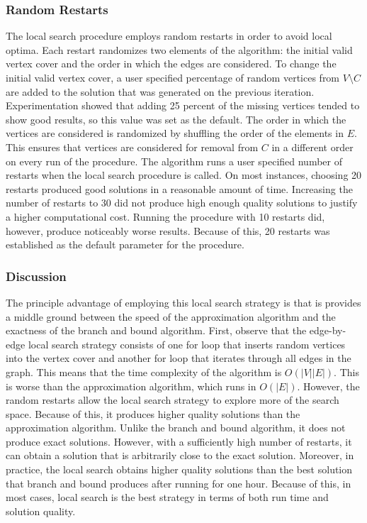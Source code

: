 \documentclass{sig-alternate-05-2015}
\begin{document}
\subsubsection{Random Restarts}
The local search procedure employs random restarts in order to avoid local optima. Each restart randomizes two elements of the algorithm: the initial valid vertex cover and the order in which the edges are considered. To change the initial valid vertex cover, a user specified percentage of random vertices from $V \setminus C$ are added to the solution that was generated on the previous iteration. Experimentation showed that adding 25 percent of the missing vertices tended to show good results, so this value was set as the default. The order in which the vertices are considered is randomized by shuffling the order of the elements in $E$. This ensures that vertices are considered for removal from $C$ in a different order on every run of the procedure. The algorithm runs a user specified number of restarts when the local search procedure is called. On most instances, choosing 20 restarts produced good solutions in a reasonable amount of time. Increasing the number of restarts to 30 did not produce high enough quality solutions to justify a higher computational cost. Running the procedure with 10 restarts did, however, produce noticeably worse results. Because of this, 20 restarts was established as the default parameter for the procedure.
\subsubsection{Discussion}
The principle advantage of employing this local search strategy is that is provides a middle ground between the speed of the approximation algorithm and the exactness of the branch and bound algorithm. First, observe that the edge-by-edge local search strategy consists of one for loop that inserts random vertices into the vertex cover and another for loop that iterates through all edges in the graph. This means that the time complexity of the algorithm is $O(|V||E|)$. This is worse than the approximation algorithm, which runs in $O(|E|)$. However, the random restarts allow the local search strategy to explore more of the search space. Because of this, it produces higher quality solutions than the approximation algorithm. Unlike the branch and bound algorithm, it does not produce exact solutions. However, with a sufficiently high number of restarts, it can obtain a solution that is arbitrarily close to the exact solution. Moreover, in practice, the local search obtains higher quality solutions than the best solution that branch and bound produces after running for one hour. Because of this, in most cases, local search is the best strategy in terms of both run time and solution quality.
\end{document}
